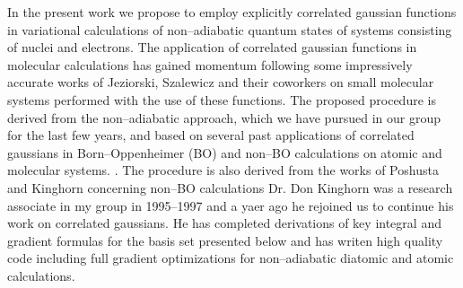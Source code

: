 In the present work we propose to employ explicitly correlated
gaussian functions in variational calculations of 
non--adiabatic quantum states of systems 
consisting of nuclei and electrons.
The application of correlated gaussian functions in
molecular calculations has gained momentum
following some impressively accurate 
works of Jeziorski, Szalewicz and
their coworkers on small molecular systems performed
with the use of these functions.
\cite{sz1}
The proposed procedure is derived from
the non--adiabatic approach, which we have pursued in our group
for the last few years, and based on several past applications
of correlated gaussians in Born--Oppenheimer (BO) 
and non--BO calculations on atomic
and molecular systems.
\cite{A2,A3,A6,A8,%
A14,%
A16,%
A20,A21,%
A27,%
A37,%
A38,A382,A383,%
kozlowski91,kozlowski92a,kozlowski92b,kozlowski92c}.
The procedure is also derived from the works 
of Poshusta and Kinghorn
concerning non--BO calculations
\cite{Poshusta83,Kinghorn93,Kinghorn95b}
Dr. Don Kinghorn was a research associate 
in my group in 1995--1997 and a yaer ago he 
rejoined us to continue his work on correlated
gaussians. He has completed derivations of key integral and
gradient formulas for the basis set presented below and has
writen high quality code including full gradient optimizations 
for non--adiabatic diatomic and atomic calculations. 

